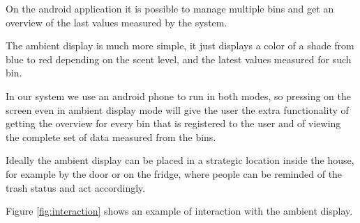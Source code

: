 On the android application it is possible to manage multiple bins and get an overview of the last values measured by the system.

The ambient display is much more simple, it just displays a color of a shade from blue to red depending on the scent level, and the latest values measured for such bin.

In our system we use an android phone to run in both modes, so pressing on the screen even in ambient display mode will give the user the extra functionality of getting the overview for every bin that is registered to the user and of viewing the complete set of data measured from the bins.

Ideally the ambient display can be placed in a strategic location inside the house, for example by the door or on the fridge, where people can be reminded of the trash status and act accordingly.

Figure \ref{fig:interaction} shows an example of interaction with the ambient display.

